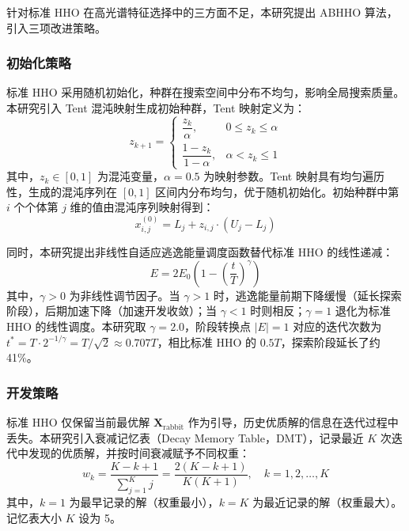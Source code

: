 \documentclass[12pt,a4paper]{article}
\begin{document}
针对标准 HHO 在高光谱特征选择中的三方面不足，本研究提出 ABHHO 算法，引入三项改进策略。

\subsubsection{初始化策略}

标准 HHO 采用随机初始化，种群在搜索空间中分布不均匀，影响全局搜索质量。本研究引入 Tent 混沌映射生成初始种群，Tent 映射定义为：
\begin{equation}
    z_{k+1} = \begin{cases}
        \dfrac{z_k}{\alpha}, & 0 \leq z_k \leq \alpha \\
        \dfrac{1 - z_k}{1 - \alpha}, & \alpha < z_k \leq 1
    \end{cases}
    \label{eq:tent_map}
\end{equation}
其中，$z_k \in [0,1]$ 为混沌变量，$\alpha = 0.5$ 为映射参数。Tent 映射具有均匀遍历性，生成的混沌序列在 $[0,1]$ 区间内分布均匀，优于随机初始化。初始种群中第 $i$ 个个体第 $j$ 维的值由混沌序列映射得到：
\begin{equation}
    x_{i,j}^{(0)} = L_j + z_{i,j} \cdot (U_j - L_j)
    \label{eq:chaos_init}
\end{equation}

同时，本研究提出非线性自适应逃逸能量调度函数替代标准 HHO 的线性递减：
\begin{equation}
    E = 2E_0\left(1 - \left(\frac{t}{T}\right)^{\gamma}\right)
    \label{eq:nonlinear_energy}
\end{equation}
其中，$\gamma > 0$ 为非线性调节因子。当 $\gamma > 1$ 时，逃逸能量前期下降缓慢（延长探索阶段），后期加速下降（加速开发收敛）；当 $\gamma < 1$ 时则相反；$\gamma = 1$ 退化为标准 HHO 的线性调度。本研究取 $\gamma = 2.0$，阶段转换点 $|E| = 1$ 对应的迭代次数为 $t^* = T \cdot 2^{-1/\gamma} = T/\sqrt{2} \approx 0.707T$，相比标准 HHO 的 $0.5T$，探索阶段延长了约 41\%。

\subsubsection{开发策略}

标准 HHO 仅保留当前最优解 $\mathbf{X}_{\mathrm{rabbit}}$ 作为引导，历史优质解的信息在迭代过程中丢失。本研究引入衰减记忆表（Decay Memory Table，DMT），记录最近 $K$ 次迭代中发现的优质解，并按时间衰减赋予不同权重：
\begin{equation}
    w_k = \frac{K - k + 1}{\sum_{j=1}^{K} j} = \frac{2(K - k + 1)}{K(K+1)}, \quad k = 1, 2, \ldots, K
    \label{eq:memory_weight}
\end{equation}
其中，$k=1$ 为最早记录的解（权重最小），$k=K$ 为最近记录的解（权重最大）。记忆表大小 $K$ 设为 5。
\end{document}
